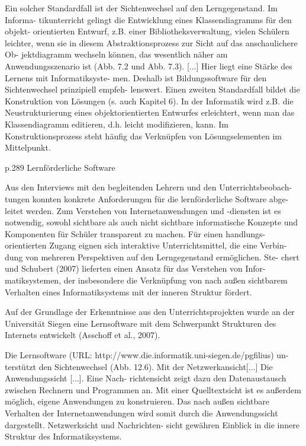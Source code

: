 Ein solcher Standardfall ist der Sichtenwechsel auf den Lerngegenstand. Im Informa-
tikunterricht gelingt die Entwicklung eines Klassendiagramms für den objekt-
orientierten Entwurf, z.B. einer Bibliotheksverwaltung, vielen Schülern leichter, 
wenn sie in diesem Abstraktionsprozess zur Sicht auf das anschaulichere Ob-
jektdiagramm wechseln können, das wesentlich näher am Anwendungsszenario 
ist (Abb. 7.2 und Abb. 7.3). [...] Hier liegt eine Stärke des Lernens mit Informatiksyste-
men. Deshalb ist Bildungssoftware für den Sichtenwechsel prinzipiell empfeh-
lenswert. 
Einen zweiten Standardfall bildet die Konstruktion von Lösungen (s. auch Kapitel 
6). In der Informatik wird z.B. die Neustrukturierung eines objektorientierten 
Entwurfes  erleichtert,  wenn  man  das  Klassendiagramm  editieren,  d.h.  leicht 
modifizieren,  kann.  Im  Konstruktionsprozess  steht  häufig  das  Verknüpfen  von 
Lösungselementen im Mittelpunkt. 

p.289
Lernförderliche Software 

Aus den Interviews mit den begleitenden Lehrern und den Unterrichtsbeobach-
tungen konnten konkrete Anforderungen für die lernförderliche Software abge-
leitet werden. Zum Verstehen von Internetanwendungen und -diensten ist es 
notwendig, sowohl sichtbare als auch nicht sichtbare informatische Konzepte 
und Komponenten für Schüler transparent zu machen. Für einen handlungs-
orientierten Zugang eignen sich interaktive Unterrichtsmittel, die eine Verbin-
dung  von  mehreren  Perspektiven  auf  den  Lerngegenstand  ermöglichen.  Ste-
chert und Schubert (2007) lieferten einen Ansatz für das Verstehen von Infor-
matiksystemen, der insbesondere die Verknüpfung von nach außen sichtbarem 
Verhalten eines Informatiksystems mit der inneren Struktur fördert.  

Auf  der  Grundlage  der  Erkenntnisse  aus  den  Unterrichtsprojekten  wurde  an 
der Universität Siegen eine Lernsoftware mit dem Schwerpunkt Strukturen des 
Internets entwickelt (Asschoff et al., 2007).  

Die Lernsoftware (URL: http://www.die.informatik.uni-siegen.de/pgfilius) un-
terstützt den Sichtenwechsel (Abb. 12.6). Mit der Netzwerkansicht[...] 
Die Anwendungssicht [...]. Eine Nach-
richtensicht zeigt dazu den Datenaustausch zwischen Rechnern und Programmen 
an.  Mit  einer  Quelltextsicht  ist  es  außerdem  möglich,  eigene  Anwendungen  zu 
konstruieren. Das nach außen sichtbare Verhalten der Internetanwendungen wird 
somit durch die Anwendungssicht dargestellt. Netzwerksicht und Nachrichten-
sicht gewähren Einblick in die innere Struktur des Informatiksystems. 

